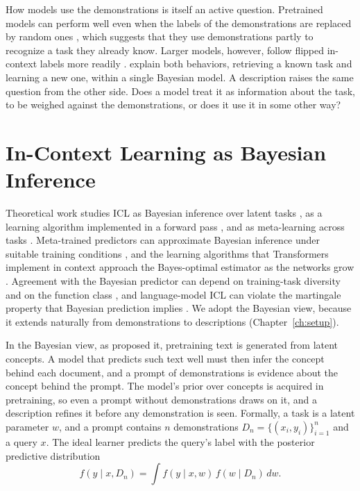 How models use the demonstrations is itself an active question. Pretrained models can perform well even when the labels of the demonstrations are replaced by random ones \citep{min2022}, which suggests that they use demonstrations partly to recognize a task they already know. Larger models, however, follow flipped in-context labels more readily \citep{wei2023}. \citet{lin2024} explain both behaviors, retrieving a known task and learning a new one, within a single Bayesian model. A description raises the same question from the other side. Does a model treat it as information about the task, to be weighed against the demonstrations, or does it use it in some other way?

\section{In-Context Learning as Bayesian Inference}\label{sec:bg-bayes}
Theoretical work studies ICL as Bayesian inference over latent tasks \citep{xie2022,panwar2024}, as a learning algorithm implemented in a forward pass \citep{akyurek2023,vonoswald2023}, and as meta-learning across tasks \citep{garg2022,muller2022}. Meta-trained predictors can approximate Bayesian inference under suitable training conditions \citep{genewein2025}, and the learning algorithms that Transformers implement in context approach the Bayes-optimal estimator as the networks grow \citep{akyurek2023}. Agreement with the Bayesian predictor can depend on training-task diversity and on the function class \citep{raventos2023,panwar2024}, and language-model ICL can violate the martingale property that Bayesian prediction implies \citep{falck2024}. We adopt the Bayesian view, because it extends naturally from demonstrations to descriptions (Chapter~\ref{ch:setup}).

In the Bayesian view, as \citet{xie2022} proposed it, pretraining text is generated from latent concepts. A model that predicts such text well must then infer the concept behind each document, and a prompt of demonstrations is evidence about the concept behind the prompt. The model's prior over concepts is acquired in pretraining, so even a prompt without demonstrations draws on it, and a description refines it before any demonstration is seen. Formally, a task is a latent parameter $w$, and a prompt contains $n$ demonstrations $D_n=\{(x_i,y_i)\}_{i=1}^n$ and a query $x$. The ideal learner predicts the query's label with the posterior predictive distribution
\begin{equation}\label{eq:bg-predictive}
    f(y \mid x, D_n) = \int f(y \mid x, w)\, f(w \mid D_n)\, dw .
\end{equation}

